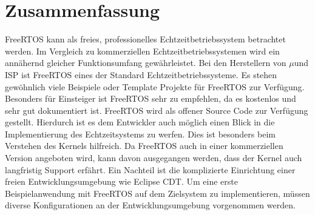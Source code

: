 \section{Zusammenfassung}
FreeRTOS kann als freies, professionelles Echtzeitbetriebssystem betrachtet werden. Im Vergleich zu kommerziellen Echtzeitbetriebssystemen wird ein annähernd gleicher Funktionsumfang gewährleistet. Bei den Herstellern von $\mu$\Controllern und ISP ist FreeRTOS eines der Standard Echtzeitbetriebssysteme. Es stehen gewöhnlich viele Beispiele oder Template Projekte für FreeRTOS zur Verfügung.  Besonders für Einsteiger ist FreeRTOS sehr zu empfehlen, da es kostenlos und sehr gut dokumentiert ist. FreeRTOS wird als offener Source Code zur Verfügung gestellt. Hierdurch ist es dem Entwickler auch möglich einen Blick in die Implementierung des Echtzeitsystems zu werfen. Dies ist besonders beim Verstehen des Kernels hilfreich. Da FreeRTOS auch in einer kommerziellen Version angeboten wird, kann davon ausgegangen werden, dass der Kernel auch langfristig Support erfährt. Ein Nachteil ist die komplizierte Einrichtung einer freien Entwicklungsumgebung wie Eclipse CDT. Um eine erste Beispielanwendung mit FreeRTOS auf dem Zielsystem zu implementieren, müssen diverse Konfigurationen an der Entwicklungsumgebung vorgenommen werden.
